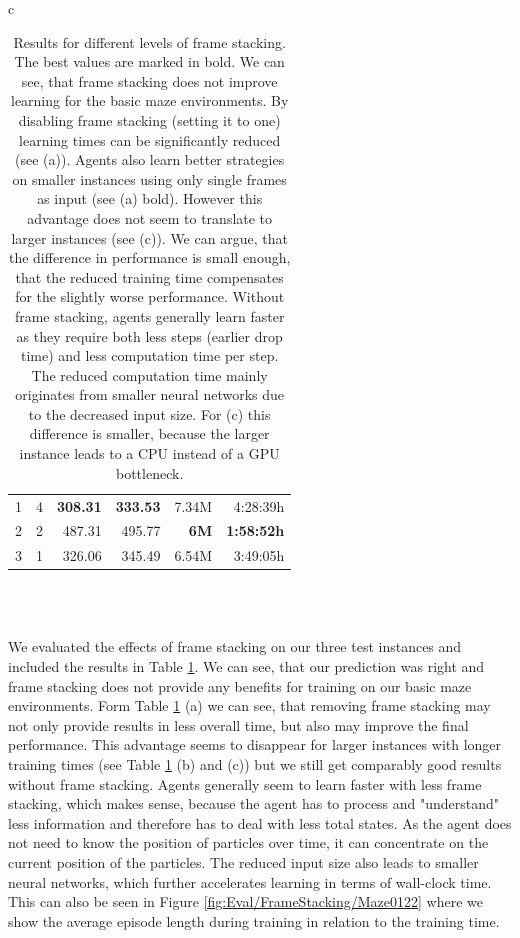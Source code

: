 \begin{table}[htp]
\begin{center}
\begin{tabular}{c}
\begin{tabular}{rcrrrr}
                \midrule
                1 & 4 & \textbf{308.31} & \textbf{333.53} & 7.34M & 4:28:39h \\
                2 & 2 & 487.31 & 495.77 & \textbf{6M} & \textbf{1:58:52h} \\
                3 & 1 & 326.06 & 345.49 & 6.54M & 3:49:05h \\
                \bottomrule
            \end{tabular} \\
             \\
        \end{tabular}
        
    \end{center}
    \caption[Evaluation Results for Different Levels of Frame Stacking]{Results for different levels of frame stacking. The best values are marked in bold. We can see, that frame stacking does not improve learning for the basic maze environments. By disabling frame stacking (setting it to one) learning times can be significantly reduced (see (a)). Agents also learn better strategies on smaller instances using only single frames as input (see (a) bold). However this advantage does not seem to translate to larger instances (see (c)). We can argue, that the difference in performance is small enough, that the reduced training time compensates for the slightly worse performance. Without frame stacking, agents generally learn faster as they require both less steps (earlier drop time) and less computation time per step. The reduced computation time mainly originates from smaller neural networks due to the decreased input size. For (c) this difference is smaller, because the larger instance leads to a CPU instead of a GPU bottleneck.} \label{tab:Eval/FrameStacking}
\end{table}

We evaluated the effects of frame stacking on our three test instances and included the results  in Table \ref{tab:Eval/FrameStacking}. We can see, that our prediction was right and frame stacking does not provide any benefits for training on our basic maze environments. Form Table \ref{tab:Eval/FrameStacking} (a) we can see, that removing frame stacking may not only provide results in less overall time, but also may improve the final performance. This advantage seems to disappear for larger instances with longer training times (see Table \ref{tab:Eval/FrameStacking} (b) and (c)) but we still get comparably good results without frame stacking. Agents generally seem to learn faster with less frame stacking, which makes sense, because the agent has to process and "understand" less information and therefore has to deal with less total states. As the agent does not need to know the position of particles over time, it can concentrate on the current position of the particles. The reduced input size also leads to smaller neural networks, which further accelerates learning in terms of wall-clock time. This can also be seen in Figure \ref{fig:Eval/FrameStacking/Maze0122} where we show the average episode length during training in relation to the training time. 

